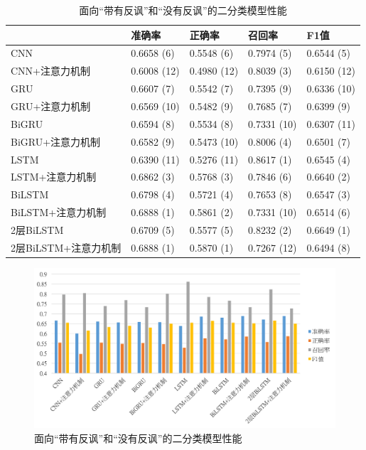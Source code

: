 \begin{table}[htb]
  \centering
  \begin{minipage}[t]{\linewidth}
  \caption{面向“带有反讽”和“没有反讽”的二分类模型性能}
  \label{tab:exp_irony_det_A_single_result}
    \begin{tabularx}{\linewidth}{X|llll}
    \toprule[1.5pt]
    & 准确率 & 正确率 & 召回率 & F1值 \\
    \hline
    CNN & 0.6658 (6) & 0.5548 (6) & 0.7974 (5) & 0.6544 (5) \\ %
    CNN+注意力机制 & 0.6008 (12) & 0.4980 (12) & 0.8039 (3) & 0.6150 (12) \\  %
    \hline
    GRU & 0.6607 (7) & 0.5542 (7) & 0.7395 (9) & 0.6336 (10) \\ %
    GRU+注意力机制 & 0.6569 (10) & 0.5482 (9) & 0.7685 (7) & 0.6399 (9) \\ %
    \hline
    BiGRU & 0.6594 (8) & 0.5534 (8) & 0.7331 (10) & 0.6307 (11) \\ %
    BiGRU+注意力机制 & 0.6582 (9) & 0.5473 (10) & 0.8006 (4) & 0.6501 (7) \\ %
    \hline
    LSTM & 0.6390 (11) & 0.5276 (11) & 0.8617 (1) & 0.6545 (4) \\ %
    LSTM+注意力机制 & 0.6862 (3) & 0.5768 (3) & 0.7846 (6) & 0.6640 (2) \\ %
    \hline
    BiLSTM & 0.6798 (4) & 0.5721 (4) & 0.7653 (8) & 0.6547 (3) \\ %
    BiLSTM+注意力机制 & 0.6888 (1) & 0.5861 (2) & 0.7331 (10) & 0.6514 (6) \\ %
    \hline
    2层BiLSTM & 0.6709 (5) & 0.5577 (5) & 0.8232 (2) & 0.6649 (1) \\ %
    2层BiLSTM+注意力机制 & 0.6888 (1) & 0.5870 (1) & 0.7267 (12) & 0.6494 (8) \\ %
    \bottomrule[1.5pt]
    \end{tabularx}
  \end{minipage}
\end{table}

\begin{figure}[H]
  \centering
  \includegraphics[width=\textwidth]{img/exp_irony_det_A_single_result_bar.png}
  \caption{面向“带有反讽”和“没有反讽”的二分类模型性能}
  \label{fig:exp_irony_det_A_single_result_bar}
\end{figure}

